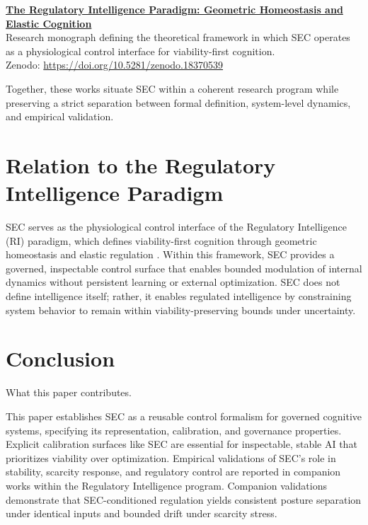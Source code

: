 \documentclass[12pt,a4paper]{article}
\begin{document}
\medskip
\noindent\textbf{\href{https://github.com/jhcragin/SpiralBrain-v3.0-public/tree/main/regulatory_intelligence_program}{The Regulatory Intelligence Paradigm: Geometric Homeostasis and Elastic Cognition}} \\
Research monograph defining the theoretical framework in which SEC operates as a physiological control interface for viability-first cognition. \\
Zenodo: \href{https://doi.org/10.5281/zenodo.18370539}{https://doi.org/10.5281/zenodo.18370539}

\medskip
Together, these works situate SEC within a coherent research program while preserving a strict separation between formal definition, system-level dynamics, and empirical validation.


\section{Relation to the Regulatory Intelligence Paradigm}

SEC serves as the physiological control interface of the Regulatory Intelligence (RI) paradigm, which defines viability-first cognition through geometric homeostasis and elastic regulation \cite{Cragin2026RI}. Within this framework, SEC provides a governed, inspectable control surface that enables bounded modulation of internal dynamics without persistent learning or external optimization. SEC does not define intelligence itself; rather, it enables regulated intelligence by constraining system behavior to remain within viability-preserving bounds under uncertainty.

\section{Conclusion}

What this paper contributes.

This paper establishes SEC as a reusable control formalism for governed cognitive systems, specifying its representation, calibration, and governance properties. Explicit calibration surfaces like SEC are essential for inspectable, stable AI that prioritizes viability over optimization. Empirical validations of SEC's role in stability, scarcity response, and regulatory control are reported in companion works within the Regulatory Intelligence program. Companion validations demonstrate that SEC-conditioned regulation yields consistent posture separation under identical inputs and bounded drift under scarcity stress.
\end{document}
